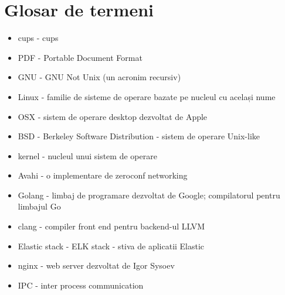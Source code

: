 \documentclass[a4paper, 12pt, twoside]{report}
\begin{document}
{\chapter{Glosar de termeni}
\begin{itemize}
\item \acrshort{cups} - \acrlong{cups}
\item PDF - Portable Document Format
\item GNU - GNU Not Unix (un acronim recursiv)
\item Linux - familie de sisteme de operare bazate pe nucleul cu același nume
\item OSX - sistem de operare desktop dezvoltat de Apple
\item BSD - Berkeley Software Distribution - sistem de operare Unix-like
\item kernel - nucleul unui sistem de operare
\item Avahi - o implementare de zeroconf networking
\item Golang - limbaj de programare dezvoltat de Google; compilatorul pentru limbajul Go
\item clang - compiler front end pentru backend-ul LLVM
\item Elastic stack - ELK stack - stiva de aplicatii Elastic
\item nginx - web server dezvoltat de Igor Sysoev
\item IPC - inter process communication
\end{itemize}

\listoffigures

\lstlistoflistings

}
\end{document}
